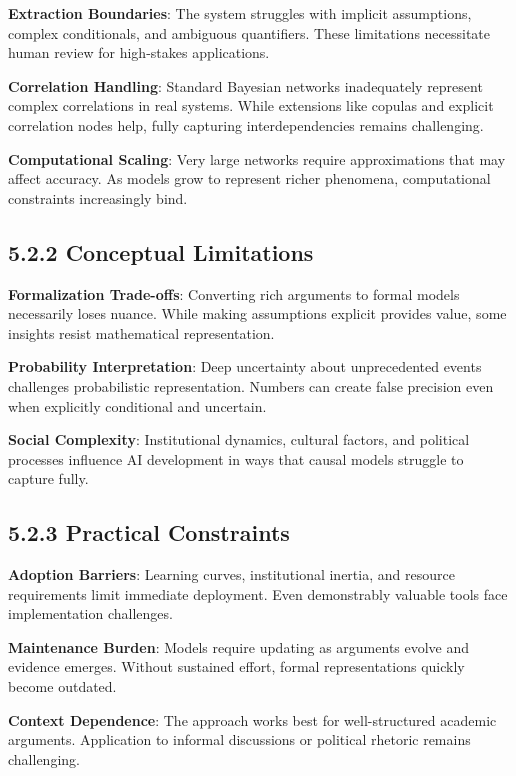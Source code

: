 \documentclass[
  11pt,
  letterpaper,
  openany]{book}
\begin{document}
\textbf{Extraction Boundaries}: The system struggles with implicit
assumptions, complex conditionals, and ambiguous quantifiers. These
limitations necessitate human review for high-stakes applications.

\textbf{Correlation Handling}: Standard Bayesian networks inadequately
represent complex correlations in real systems. While extensions like
copulas and explicit correlation nodes help, fully capturing
interdependencies remains challenging.

\textbf{Computational Scaling}: Very large networks require
approximations that may affect accuracy. As models grow to represent
richer phenomena, computational constraints increasingly bind.

\subsection{5.2.2 Conceptual
Limitations}\label{sec-conceptual-limitations}

\textbf{Formalization Trade-offs}: Converting rich arguments to formal
models necessarily loses nuance. While making assumptions explicit
provides value, some insights resist mathematical representation.

\textbf{Probability Interpretation}: Deep uncertainty about
unprecedented events challenges probabilistic representation. Numbers
can create false precision even when explicitly conditional and
uncertain.

\textbf{Social Complexity}: Institutional dynamics, cultural factors,
and political processes influence AI development in ways that causal
models struggle to capture fully.

\subsection{5.2.3 Practical
Constraints}\label{sec-practical-constraints}

\textbf{Adoption Barriers}: Learning curves, institutional inertia, and
resource requirements limit immediate deployment. Even demonstrably
valuable tools face implementation challenges.

\textbf{Maintenance Burden}: Models require updating as arguments evolve
and evidence emerges. Without sustained effort, formal representations
quickly become outdated.

\textbf{Context Dependence}: The approach works best for well-structured
academic arguments. Application to informal discussions or political
rhetoric remains challenging.
\end{document}
